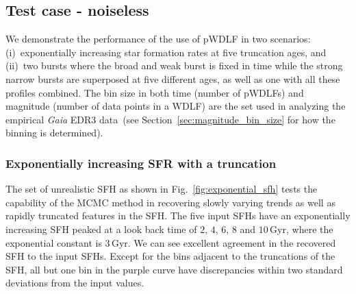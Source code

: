 \documentclass[fleqn,usenatbib]{mnras}
\begin{document}
\subsection{Test case - noiseless}

We demonstrate the performance of the use of pWDLF in two scenarios:
(i)~exponentially increasing star formation rates at five truncation ages, and
(ii)~two bursts where the broad and weak burst is fixed in time while the strong
narrow bursts are superposed at five different ages, as well as one with all
these profiles combined. The bin size in both time (number of pWDLFs) and
magnitude (number of data points in a WDLF) are the set used in analyzing the
empirical \textit{Gaia} EDR3 data~(see Section~\ref{sec:magnitude_bin_size} for how
the binning is determined).

\subsubsection*{Exponentially increasing SFR with a truncation}
The set of unrealistic SFH as shown in Fig.~\ref{fig:exponential_sfh} tests the
capability of the MCMC method in recovering slowly varying trends as well as
rapidly truncated features in the SFH. The five input SFHs have an exponentially
increasing SFH peaked at a look back time of $2$, $4$, $6$, $8$ and $10$\,Gyr,
where the exponential constant is $3$\,Gyr. We can see excellent agreement in
the recovered SFH to the input SFHs. Except for the bins adjacent to
the truncations of the SFH, all but one bin in the purple curve have
discrepancies within two standard deviations from the input values. 
\end{document}
